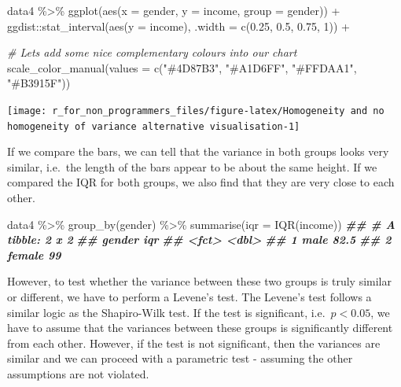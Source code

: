 \documentclass[
]{book}
\newenvironment{Shaded}{\begin{snugshade}}{\end{snugshade}}
\newcommand{\AttributeTok}[1]{\textcolor[rgb]{0.77,0.63,0.00}{#1}}
\newcommand{\CommentTok}[1]{\textcolor[rgb]{0.56,0.35,0.01}{\textit{#1}}}
\newcommand{\DecValTok}[1]{\textcolor[rgb]{0.00,0.00,0.81}{#1}}
\newcommand{\DocumentationTok}[1]{\textcolor[rgb]{0.56,0.35,0.01}{\textbf{\textit{#1}}}}
\newcommand{\FloatTok}[1]{\textcolor[rgb]{0.00,0.00,0.81}{#1}}
\newcommand{\FunctionTok}[1]{\textcolor[rgb]{0.00,0.00,0.00}{#1}}
\newcommand{\NormalTok}[1]{#1}
\newcommand{\SpecialCharTok}[1]{\textcolor[rgb]{0.00,0.00,0.00}{#1}}
\newcommand{\StringTok}[1]{\textcolor[rgb]{0.31,0.60,0.02}{#1}}
\begin{document}
\begin{Shaded}
\begin{Highlighting}[]
\NormalTok{data4 }\SpecialCharTok{\%\textgreater{}\%} 
  \FunctionTok{ggplot}\NormalTok{(}\FunctionTok{aes}\NormalTok{(}\AttributeTok{x =}\NormalTok{ gender, }\AttributeTok{y =}\NormalTok{ income, }\AttributeTok{group =}\NormalTok{ gender)) }\SpecialCharTok{+}
\NormalTok{  ggdist}\SpecialCharTok{::}\FunctionTok{stat\_interval}\NormalTok{(}\FunctionTok{aes}\NormalTok{(}\AttributeTok{y =}\NormalTok{ income),}
                        \AttributeTok{.width =} \FunctionTok{c}\NormalTok{(}\FloatTok{0.25}\NormalTok{, }\FloatTok{0.5}\NormalTok{, }\FloatTok{0.75}\NormalTok{, }\DecValTok{1}\NormalTok{)) }\SpecialCharTok{+}
  
  \CommentTok{\# Let\textquotesingle{}s add some nice complementary colours into our chart}
  \FunctionTok{scale\_color\_manual}\NormalTok{(}\AttributeTok{values =} \FunctionTok{c}\NormalTok{(}\StringTok{"\#4D87B3"}\NormalTok{, }\StringTok{"\#A1D6FF"}\NormalTok{, }\StringTok{"\#FFDAA1"}\NormalTok{, }\StringTok{"\#B3915F"}\NormalTok{))}
\end{Highlighting}
\end{Shaded}

\begin{center}\texttt{[image: r\_for\_non\_programmers\_files/figure-latex/Homogeneity and no homogeneity of variance alternative visualisation-1]} \end{center}

If we compare the bars, we can tell that the variance in both groups looks very similar, i.e.~the length of the bars appear to be about the same height. If we compared the IQR for both groups, we also find that they are very close to each other.

\begin{Shaded}
\begin{Highlighting}[]
\NormalTok{data4 }\SpecialCharTok{\%\textgreater{}\%} 
  \FunctionTok{group\_by}\NormalTok{(gender) }\SpecialCharTok{\%\textgreater{}\%} 
  \FunctionTok{summarise}\NormalTok{(}\AttributeTok{iqr =} \FunctionTok{IQR}\NormalTok{(income))}
\DocumentationTok{\#\# \# A tibble: 2 x 2}
\DocumentationTok{\#\#   gender   iqr}
\DocumentationTok{\#\#   \textless{}fct\textgreater{}  \textless{}dbl\textgreater{}}
\DocumentationTok{\#\# 1 male    82.5}
\DocumentationTok{\#\# 2 female  99}
\end{Highlighting}
\end{Shaded}

However, to test whether the variance between these two groups is truly similar or different, we have to perform a Levene's test. The Levene's test follows a similar logic as the Shapiro-Wilk test. If the test is significant, i.e.~\(p < 0.05\), we have to assume that the variances between these groups is significantly different from each other. However, if the test is not significant, then the variances are similar and we can proceed with a parametric test - assuming the other assumptions are not violated.
\end{document}
